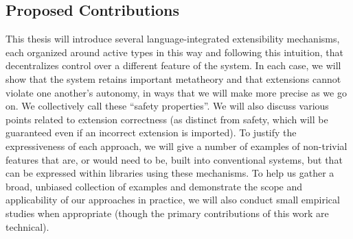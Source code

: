 

\subsection{Proposed Contributions}
This thesis will introduce several language-integrated extensibility mechanisms, each organized around active types in this way and following this intuition, that decentralizes control over a different feature of the system. In each case, we will show that the system retains important metatheory and that extensions cannot violate one another's autonomy, in ways that we will make more precise as we go on. We collectively call these ``safety properties''. We will also discuss various points related to extension correctness (as distinct from safety, which will be guaranteed even if an incorrect extension is imported). To justify the  expressiveness of each approach, we will give a number of examples of non-trivial features that are, or would need to be, built into conventional systems, but that can be expressed within libraries using these mechanisms. To help us gather a broad, unbiased collection of examples and demonstrate the scope and applicability of our approaches in practice, we will also conduct small empirical studies when appropriate (though the primary contributions of this work are technical).

